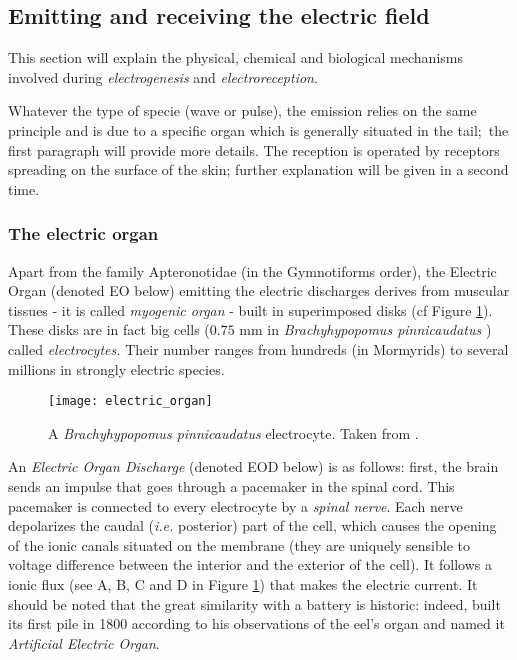 \subsection{Emitting and receiving the electric field}

This section will explain the physical, chemical and biological mechanisms
involved during \emph{electrogenesis} and \emph{electroreception}.

Whatever the type of specie (wave or pulse), the emission relies on
the same principle and is due to a specific organ which is generally
situated in the tail;~the first paragraph will provide more details.
The reception is operated by receptors spreading on the surface of
the skin; further explanation will be given in a second time.


\subsubsection*{The electric organ}

Apart from the family Apteronotidae (in the Gymnotiforms order), the
Electric Organ (denoted EO below) emitting the electric discharges
derives from muscular tissues - it is called \emph{myogenic organ}
- built in superimposed disks (cf Figure \ref{fig:electric_organ}).
These disks are in fact big cells ($0.75$ mm in \emph{Brachyhypopomus
pinnicaudatus} \cite{stoddard2008signal}) called \emph{electrocytes.}
Their number ranges from hundreds (in Mormyrids) to several millions
in strongly electric species.%
\begin{figure}[!h]
 \centering \texttt{[image: electric\_organ]} \caption{A \emph{Brachyhypopomus pinnicaudatus}
 electrocyte. Taken from \cite{stoddard2008signal}.
\label{fig:electric_organ}}

\end{figure}


An \emph{Electric Organ Discharge} (denoted EOD below) is as follows:
first, the brain sends an impulse that goes through a pacemaker in
the spinal cord. This pacemaker is connected to every electrocyte
by a \emph{spinal nerve}. Each nerve depolarizes the caudal (\emph{i.e.}
posterior) part of the cell, which causes the opening of the ionic
canals situated on the membrane (they are uniquely sensible to voltage
difference between the interior and the exterior of the cell). It
follows a ionic flux (see A, B, C and D in Figure \ref{fig:electric_organ})
that makes the electric current. It should be noted that the great
similarity with a battery is historic: indeed,  built
its first pile in 1800 according to his observations of the eel's
organ \cite{volta1800} and named it \emph{Artificial Electric Organ}.

